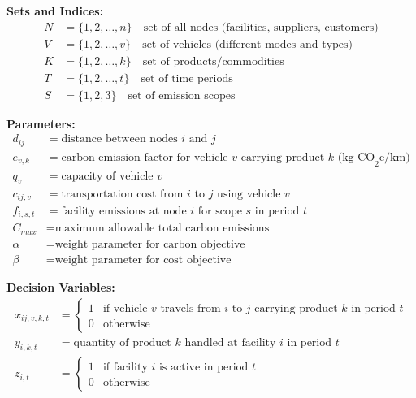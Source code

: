 \documentclass{article}
\begin{document}
\textbf{Sets and Indices:}
\begin{align}
N &= \{1, 2, \ldots, n\} \quad \text{set of all nodes (facilities, suppliers, customers)} \\
V &= \{1, 2, \ldots, v\} \quad \text{set of vehicles (different modes and types)} \\
K &= \{1, 2, \ldots, k\} \quad \text{set of products/commodities} \\
T &= \{1, 2, \ldots, t\} \quad \text{set of time periods} \\
S &= \{1, 2, 3\} \quad \text{set of emission scopes}
\end{align}

\textbf{Parameters:}
\begin{align}
d_{ij} &= \text{distance between nodes } i \text{ and } j \\
e_{v,k} &= \text{carbon emission factor for vehicle } v \text{ carrying product } k \text{ (kg CO}_2\text{e/km)} \\
q_{v} &= \text{capacity of vehicle } v \\
c_{ij,v} &= \text{transportation cost from } i \text{ to } j \text{ using vehicle } v \\
f_{i,s,t} &= \text{facility emissions at node } i \text{ for scope } s \text{ in period } t \\
C_{max} &= \text{maximum allowable total carbon emissions} \\
\alpha &= \text{weight parameter for carbon objective} \\
\beta &= \text{weight parameter for cost objective}
\end{align}

\textbf{Decision Variables:}
\begin{align}
x_{ij,v,k,t} &= \begin{cases} 1 & \text{if vehicle } v \text{ travels from } i \text{ to } j \text{ carrying product } k \text{ in period } t \\ 0 & \text{otherwise} \end{cases} \\
y_{i,k,t} &= \text{quantity of product } k \text{ handled at facility } i \text{ in period } t \\
z_{i,t} &= \begin{cases} 1 & \text{if facility } i \text{ is active in period } t \\ 0 & \text{otherwise} \end{cases}
\end{align}
\end{document}
